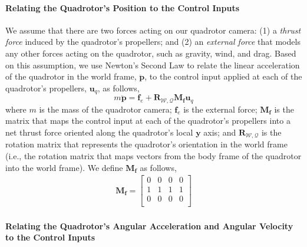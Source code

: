 \paragraph{Relating the Quadrotor's Position to the Control Inputs}

We assume that there are two forces acting on our quadrotor camera: (1) a \emph{thrust force} induced by the quadrotor's propellers; and (2) an \emph{external force} that models any other forces acting on the quadrotor, such as gravity, wind, and drag.
Based on this assumption, we use Newton's Second Law to relate the linear acceleration of the quadrotor in the world frame, $\ddot{\mathbf{p}}$, to the control input applied at each of the quadrotor's propellers, $\mathbf{u}_q$, as follows,
%
\begin{equation}
m \ddot{\mathbf{p}} = \mathbf{f}_e + \mathbf{R}_{\mathcal{W},\mathcal{Q}} \mathbf{M}_{\mathbf{f}} \mathbf{u}_q
\end{equation}
%
where $m$ is the mass of the quadrotor camera; $\mathbf{f}_e$ is the external force; $\mathbf{M}_{\mathbf{f}}$ is the matrix that maps the control input at each of the quadrotor's propellers into a net thrust force oriented along the quadrotor's local $\mathbf{y}$ axis; and $\mathbf{R}_{\mathcal{W},\mathcal{Q}}$ is the rotation matrix that represents the quadrotor's orientation in the world frame (i.e., the rotation matrix that maps vectors from the body frame of the quadrotor into the world frame).
We define $\mathbf{M}_{\mathbf{f}}$ as follows, 
%
\footnotesize
\begin{equation}
\begin{aligned}
%
\mathbf{M}_{\mathbf{f}} =
\begin{bmatrix}
0 & 0 & 0 & 0 \\
1 & 1 & 1 & 1 \\
0 & 0 & 0 & 0 \\
\end{bmatrix}
%
\end{aligned}
\end{equation}
\normalsize
%

\paragraph{Relating the Quadrotor's Angular Acceleration and Angular Velocity to the Control Inputs}


